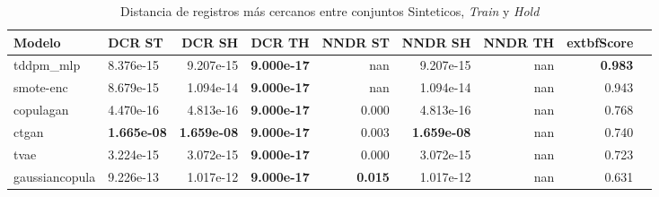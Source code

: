 \begin{table}[H]
\centering
\caption{Distancia de registros más cercanos entre conjuntos Sinteticos, \emph{Train} y \emph{Hold}}
\label{table-dcr-economicos-b-2}
\begin{tabular}{|l|l|r|r|r|r|r|r|r|}
\hline
\rowcolor[gray]{0.8}
Modelo & DCR ST & DCR SH & DCR TH & NNDR ST & NNDR SH & NNDR TH & 	extbf{Score} \\
\hline tddpm\_mlp & 8.376e-15 & 9.207e-15 & \cellcolor[rgb]{0.9, 0.54, 0.52} \bfseries 9.000e-17 & nan & 9.207e-15 & nan & \bfseries 0.983 \\
\hline smote-enc & 8.679e-15 & 1.094e-14 & \cellcolor[rgb]{0.9, 0.54, 0.52} \bfseries 9.000e-17 & nan & 1.094e-14 & nan & 0.943 \\
\hline copulagan & \cellcolor[rgb]{0.9, 0.54, 0.52} 4.470e-16 & \cellcolor[rgb]{0.9, 0.54, 0.52} 4.813e-16 & \cellcolor[rgb]{0.9, 0.54, 0.52} \bfseries 9.000e-17 & \cellcolor[rgb]{0.9, 0.54, 0.52} 0.000 & \cellcolor[rgb]{0.9, 0.54, 0.52} 4.813e-16 & nan & 0.768 \\
\hline ctgan & \bfseries 1.665e-08 & \bfseries 1.659e-08 & \cellcolor[rgb]{0.9, 0.54, 0.52} \bfseries 9.000e-17 & 0.003 & \bfseries 1.659e-08 & nan & 0.740 \\
\hline tvae & 3.224e-15 & 3.072e-15 & \cellcolor[rgb]{0.9, 0.54, 0.52} \bfseries 9.000e-17 & 0.000 & 3.072e-15 & nan & 0.723 \\
\hline gaussiancopula & 9.226e-13 & 1.017e-12 & \cellcolor[rgb]{0.9, 0.54, 0.52} \bfseries 9.000e-17 & \bfseries 0.015 & 1.017e-12 & nan & 0.631 \\
\hline
\end{tabular}
\end{table}
